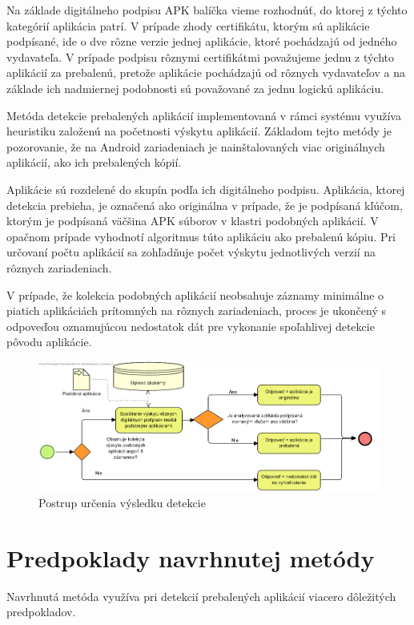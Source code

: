 Na základe digitálneho podpisu APK balíčka vieme rozhodnúť, do ktorej z týchto kategórií aplikácia patrí. V prípade zhody certifikátu, ktorým sú aplikácie podpísané, ide o dve rôzne verzie jednej aplikácie, ktoré pochádzajú od jedného vydavateľa. V prípade podpisu rôznymi certifikátmi považujeme jednu z týchto aplikácií za prebalenú, pretože aplikácie pochádzajú od rôznych vydavateľov a na základe ich nadmiernej podobnosti sú považované za jednu logickú aplikáciu.

Metóda detekcie prebalených aplikácií implementovaná v rámci systému  využíva heuristiku založenú na početnosti výskytu aplikácií. Základom tejto metódy je pozorovanie, že na Android zariadeniach je nainštalovaných viac originálnych aplikácií, ako ich prebalených kópií.

Aplikácie sú rozdelené do skupín podľa ich digitálneho podpisu. Aplikácia, ktorej detekcia prebieha, je označená ako originálna v prípade, že je podpísaná kľúčom, ktorým je podpísaná väčšina APK súborov v klastri podobných aplikácií.  V opačnom prípade vyhodnotí algoritmus túto aplikáciu ako prebalenú kópiu. Pri určovaní počtu aplikácií sa zohľadňuje počet výskytu jednotlivých verzií na rôznych zariadeniach. 

V prípade, že kolekcia podobných aplikácií neobsahuje záznamy minimálne o piatich aplikáciách prítomných na rôznych zariadeniach, proces je ukončený s odpoveďou oznamujúcou nedostatok dát pre vykonanie spoľahlivej detekcie pôvodu aplikácie.

\begin{figure}[htb]
  \begin{center}
    \includegraphics[width=130mm]{images/detection-original.png}
  \end{center}
  \caption{Postrup určenia výsledku detekcie}
  \label{fig:detectionOriginal}
\end{figure}

\section{Predpoklady navrhnutej metódy}
Navrhnutá metóda využíva pri detekcií prebalených aplikácií viacero dôležitých predpokladov.


